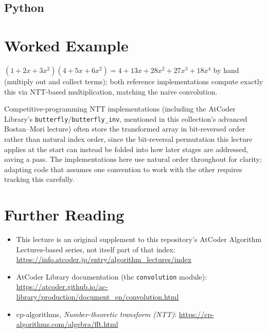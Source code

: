 \documentclass[11pt]{article}
\begin{document}
\subsection{Python}

\section{Worked Example}
\begin{examplebox}
$(1+2x+3x^2)(4+5x+6x^2) = 4+13x+28x^2+27x^3+18x^4$ by hand (multiply out
and collect terms); both reference implementations compute exactly this
via NTT-based multiplication, matching the naive convolution.
\end{examplebox}

\begin{notebox}
Competitive-programming NTT implementations (including the AtCoder
Library's \texttt{butterfly}/\texttt{butterfly\_inv}, mentioned in this
collection's advanced Bostan--Mori lecture) often store the transformed
array in bit-reversed order rather than natural index order, since the
bit-reversal permutation this lecture applies at the start can instead be
folded into how later stages are addressed, saving a pass. The
implementations here use natural order throughout for clarity; adapting
code that assumes one convention to work with the other requires
tracking this carefully.
\end{notebox}

\section{Further Reading}
\begin{itemize}[leftmargin=1.5em]
  \item This lecture is an original supplement to this repository's
        AtCoder Algorithm Lectures-based series, not itself part of that
        index: \url{https://info.atcoder.jp/entry/algorithm_lectures/index}
  \item AtCoder Library documentation (the \texttt{convolution} module):
        \url{https://atcoder.github.io/ac-library/production/document_en/convolution.html}
  \item cp-algorithms, \emph{Number-theoretic transform (NTT)}:
        \url{https://cp-algorithms.com/algebra/fft.html}
\end{itemize}
\end{document}
